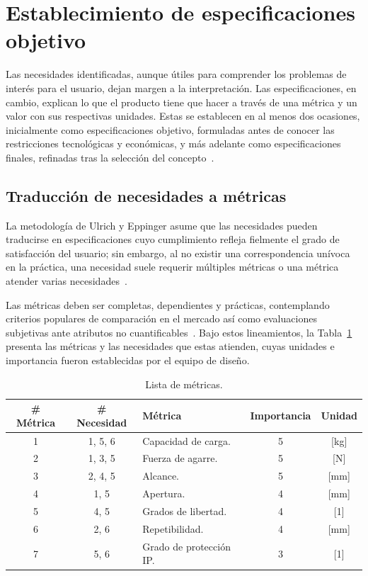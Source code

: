 \section{Establecimiento de especificaciones objetivo}

Las necesidades identificadas, aunque útiles para comprender los problemas de interés para el usuario, dejan margen a la interpretación. Las especificaciones, en cambio, explican lo que el producto tiene que hacer a través de una métrica y un valor con sus respectivas unidades. Estas se establecen en al menos dos ocasiones, inicialmente como especificaciones objetivo, formuladas antes de conocer las restricciones tecnológicas y económicas, y más adelante como especificaciones finales, refinadas tras la selección del concepto~\cite{Ulrich-Eppinger}.

\subsection{Traducción de necesidades a métricas}

La metodología de Ulrich y Eppinger asume que las necesidades pueden traducirse en especificaciones cuyo cumplimiento refleja fielmente el grado de satisfacción del usuario; sin embargo, al no existir una correspondencia unívoca en la práctica, una necesidad suele requerir múltiples métricas o una métrica atender varias necesidades~\cite{Ulrich-Eppinger}.

Las métricas deben ser completas, dependientes y prácticas, contemplando criterios populares de comparación en el mercado así como evaluaciones subjetivas ante atributos no cuantificables~\cite{Ulrich-Eppinger}. Bajo estos lineamientos, la Tabla~\ref{tab:metricas} presenta las métricas y las necesidades que estas atienden, cuyas unidades e importancia fueron establecidas por el equipo de diseño.

\begin{table}[htbp]
\centering
\caption{Lista de métricas.}
\label{tab:metricas}
\renewcommand{\arraystretch}{1.3}
\begin{tabularx}{\textwidth}{cc>{\centering\arraybackslash}Xcc}
\hline
\textbf{\# Métrica} & \textbf{\# Necesidad} & \textbf{Métrica} & \textbf{Importancia} & \textbf{Unidad} \\
\hline
1 & 1, 5, 6 & Capacidad de carga.     & 5 & {[}kg{]} \\
2 & 1, 3, 5 & Fuerza de agarre.       & 5 & {[}N{]}  \\
3 & 2, 4, 5 & Alcance.                & 5 & {[}mm{]} \\
4 & 1, 5    & Apertura.               & 4 & {[}mm{]} \\
5 & 4, 5    & Grados de libertad.     & 4 & {[}1{]}  \\
6 & 2, 6    & Repetibilidad.          & 4 & {[}mm{]} \\
7 & 5, 6    & Grado de protección IP. & 3 & {[}1{]}  \\
\hline
\end{tabularx}
\end{table}

